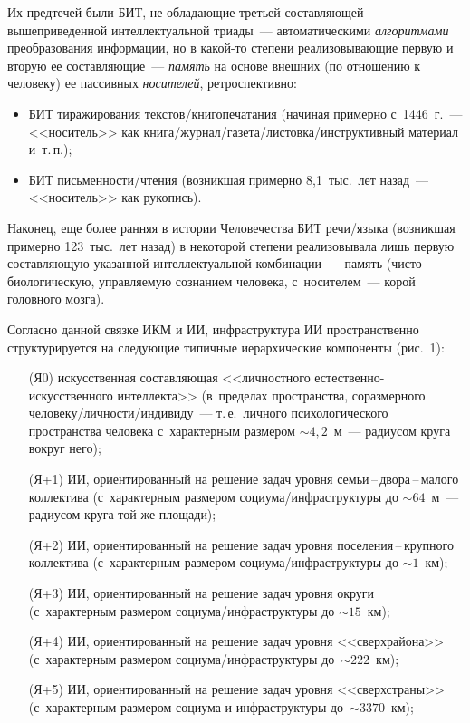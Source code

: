 \begin{multicols}{2}
  Их предтечей были БИТ, не обладающие треть\-ей составляющей 
вышеприведенной интеллектуальной триады~--- автоматическими 
\textit{алгоритмами} преобразования информации, но в ка\-кой-то степени 
реа\-ли\-зо\-вы\-ва\-ющие первую и вторую ее со\-став\-ля\-ющие~--- \textit{память} на 
основе внешних (по отношению к человеку) ее пассивных \textit{носителей}, 
рет\-ро\-спек\-тивно: 
  \begin{itemize}
\item БИТ тиражирования текстов/книгопечатания (начиная примерно с~1446~г.~--- <<носитель>> как  
кни\-га/жур\-нал/га\-зе\-та/лис\-тов\-ка/ин\-струк\-тив\-ный материал 
и~т.\,п.);
\item БИТ письменности/чте\-ния (возникшая примерно 8,1~тыс.\ лет назад~--- 
<<носитель>> как рукопись).
\end{itemize}

  Наконец, еще более ранняя в истории Человечества БИТ ре\-чи/язы\-ка 
(возникшая примерно 123~тыс.\ лет назад) в некоторой степени 
реализовывала лишь первую со\-став\-ля\-ющую указанной интеллектуальной 
комбинации~--- память (чис\-то биологическую, управляемую сознанием 
человека, с~носителем~--- корой головного мозга). 
  
  Согласно данной связке ИКМ и ИИ, инфраструктура ИИ пространственно 
структурируется на сле\-ду\-ющие типичные иерархические компоненты 
(рис.~1): 
  \begin{enumerate}[Я+7)]
\item[(Я0)] искусственная составляющая <<личностного  
ес\-тест\-вен\-но-ис\-кус\-ст\-вен\-но\-го интеллекта>> (в~пределах 
пространства, соразмерного  
че\-ло\-ве\-ку/лич\-ности/ин\-ди\-ви\-ду~--- т.\,е.\ личного 
психологического пространства человека с~характерным размером $\sim 
4{,}2$~м~--- радиусом круга вокруг него);
\item[(Я+1)] ИИ, ориентированный на решение задач уровня  
семьи\,--\,дво\-ра\,--\,ма\-ло\-го коллектива (с~характерным размером  
со\-ци\-ума/инфра\-струк\-ту\-ры до $\sim64$~м~--- радиусом круга той 
же площади);
\item[(Я+2)] ИИ, ориентированный на решение задач уровня  
по\-се\-ле\-ния\,--\,круп\-но\-го коллектива (с~характерным размером  
со\-ци\-ума/инфра\-струк\-ту\-ры до $\sim 1$~км);
\item[(Я+3)] ИИ, ориентированный на решение задач уровня округи 
(с~характерным размером со\-ци\-ума/инфра\-струк\-ту\-ры до $\sim 
15$~км);
\item[(Я+4)] ИИ, ориентированный на решение задач уровня <<сверхрайона>> 
(с~характерным размером со\-ци\-ума/инфра\-струк\-ту\-ры 
\mbox{до~$\sim 222$~км});
\item[(Я+5)] ИИ, ориентированный на решение задач уровня 
<<сверхстраны>> (с~характерным размером социума и инфраструктуры 
\mbox{до~$\sim 3370$~км});
\end{enumerate}

\end{multicols}

